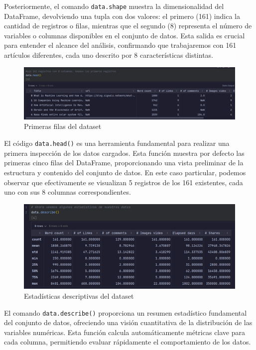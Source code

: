 \documentclass[12pt, a4paper]{article}
\begin{document}
Posteriormente, el comando \texttt{data.shape} muestra la dimensionalidad del DataFrame, devolviendo una tupla con dos valores: el primero (161) indica la cantidad de registros o filas, mientras que el segundo (8) representa el número de variables o columnas disponibles en el conjunto de datos. Esta salida es crucial para entender el alcance del análisis, confirmando que trabajaremos con 161 artículos diferentes, cada uno descrito por 8 características distintas.

\begin{figure}[H]
    \centering
    \includegraphics[width=1.0\textwidth]{Actividad-9/Imagen3.png}
    \caption{Primeras filas del dataset}
\end{figure}

El código \texttt{data.head()} es una herramienta fundamental para realizar una primera inspección de los datos cargados. Esta función muestra por defecto las primeras cinco filas del DataFrame, proporcionando una vista preliminar de la estructura y contenido del conjunto de datos. En este caso particular, podemos observar que efectivamente se visualizan 5 registros de los 161 existentes, cada uno con sus 8 columnas correspondientes.

\begin{figure}[H]
    \centering
    \includegraphics[width=1.0\textwidth]{Actividad-9/Imagen4.png}
    \caption{Estadísticas descriptivas del dataset}
    \label{fig:Carga y exploración inicial de datos}
\end{figure}

El comando \texttt{data.describe()} proporciona un resumen estadístico fundamental del conjunto de datos, ofreciendo una visión cuantitativa de la distribución de las variables numéricas. Esta función calcula automáticamente métricas clave para cada columna, permitiendo evaluar rápidamente el comportamiento de los datos.
\end{document}
